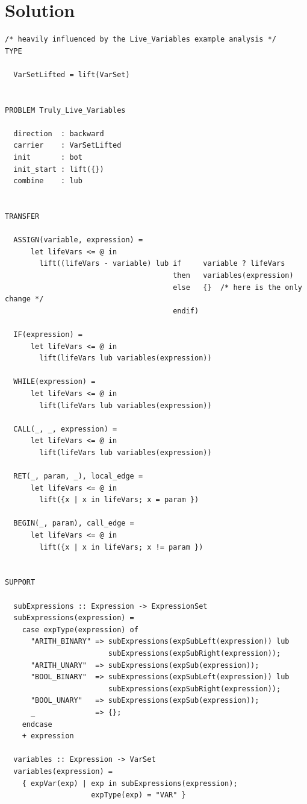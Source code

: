 \documentclass[a4paper]{article}
\begin{document}
\section{Solution}
\begin{verbatim}
/* heavily influenced by the Live_Variables example analysis */
TYPE

  VarSetLifted = lift(VarSet)


PROBLEM Truly_Live_Variables

  direction  : backward
  carrier    : VarSetLifted
  init       : bot
  init_start : lift({})
  combine    : lub


TRANSFER

  ASSIGN(variable, expression) =
      let lifeVars <= @ in
        lift((lifeVars - variable) lub if     variable ? lifeVars
                                       then   variables(expression)
                                       else   {}  /* here is the only change */
                                       endif)

  IF(expression) =
      let lifeVars <= @ in
        lift(lifeVars lub variables(expression))
  
  WHILE(expression) =
      let lifeVars <= @ in
        lift(lifeVars lub variables(expression))

  CALL(_, _, expression) =
      let lifeVars <= @ in
        lift(lifeVars lub variables(expression))

  RET(_, param, _), local_edge =
      let lifeVars <= @ in
        lift({x | x in lifeVars; x = param })

  BEGIN(_, param), call_edge =
      let lifeVars <= @ in
        lift({x | x in lifeVars; x != param })


SUPPORT

  subExpressions :: Expression -> ExpressionSet
  subExpressions(expression) =
    case expType(expression) of
      "ARITH_BINARY" => subExpressions(expSubLeft(expression)) lub
                        subExpressions(expSubRight(expression));
      "ARITH_UNARY"  => subExpressions(expSub(expression));
      "BOOL_BINARY"  => subExpressions(expSubLeft(expression)) lub
                        subExpressions(expSubRight(expression));
      "BOOL_UNARY"   => subExpressions(expSub(expression));
      _              => {}; 
    endcase
    + expression

  variables :: Expression -> VarSet
  variables(expression) =
    { expVar(exp) | exp in subExpressions(expression);
                    expType(exp) = "VAR" }
\end{verbatim}
\end{document}
